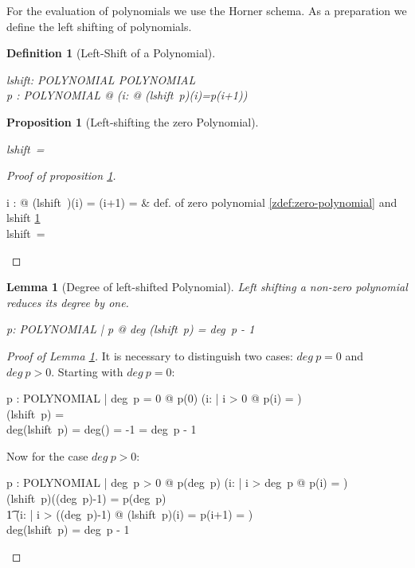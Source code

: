 \documentclass[12pt]{scrartcl}
\newtheorem{prop}{Proposition}[section]
\newtheorem{lemma}{Lemma}[section]
\newtheorem{zdef}{Definition}[section]
\begin{document}
For the evaluation of polynomials we use the Horner schema. As a
preparation we define the left shifting of polynomials.
 
\begin{zdef}[Left-Shift of a Polynomial]
  \label{zdef:left-shift}
  \begin{axdef}
    lshift: POLYNOMIAL \fun POLYNOMIAL \\
    \where
    \forall p : POLYNOMIAL @ (\forall i: \nat @ (lshift~p)(i)=p(i+1))
  \end{axdef}
\end{zdef}

\begin{prop}[Left-shifting the zero Polynomial]
  \label{prop:left-shift-zero-polynomial}
  \begin{zed}
    lshift~\zeropol = \zeropol
  \end{zed}
\end{prop}

\begin{proof}[Proof of proposition
  \ref{prop:left-shift-zero-polynomial}]
  \begin{argue}
    \forall i : \nat @ (lshift~\zeropol)(i) = \zeropol(i+1) = \azero &
    def. of zero polynomial  \ref{zdef:zero-polynomial} and
    lshift \ref{zdef:left-shift}\\
    \vdash lshift~\zeropol = \zeropol \\
  \end{argue}
  
\end{proof}

\begin{lemma}[Degree of left-shifted Polynomial]
  \label{lemma:degree-left-shift}
  Left shifting a non-zero polynomial reduces its degree by one.
  \begin{zed}
    \forall p: POLYNOMIAL | p \neq \zeropol @ deg (lshift~p) = deg~p - 1
  \end{zed}
\end{lemma}

\begin{proof}[Proof of Lemma \ref{lemma:degree-left-shift}]
  It is necessary to distinguish two cases: $deg~p = 0$ and $deg~p >
  0$. Starting with  $deg~p = 0$:
  \begin{argue}
    p : POLYNOMIAL | deg~p = 0 @ p(0) \neq \azero \land
    (\forall i: \nat | i > 0 @ p(i) = \azero)\\
    \vdash (lshift~p) = \zeropol \\
    \vdash deg(lshift~p) = deg(\zeropol) = -1 = deg~p - 1
  \end{argue}
  Now for the case $deg~p > 0$:
  \begin{argue}
    p : POLYNOMIAL | deg~p > 0 @ p(deg~p) \neq \azero \land
    (\forall i: \nat | i > deg~p @ p(i) = \azero)\\
    \vdash (lshift~p)((deg~p)-1) = p(deg~p) \neq \azero \\
    \t1 \land (\forall i: \nat | i > ((deg~p)-1) @ (lshift~p)(i) =
    p(i+1) = \azero)\\
    \vdash deg(lshift~p) = deg~p - 1
  \end{argue}
\end{proof}
\end{document}
